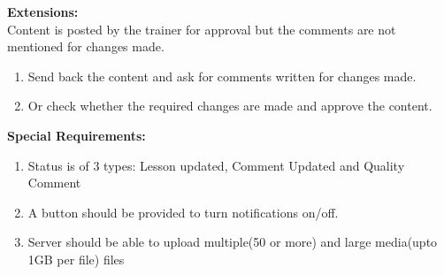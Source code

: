 \documentclass{report}
\begin{document}
\textbf{Extensions:}\\
Content is posted by the trainer for approval but the comments are not mentioned for changes made.
\begin{enumerate}
    \item Send back the content and ask for comments written for changes made.
    \item Or check whether the required changes are made and approve the content.
\end{enumerate}
\textbf{Special Requirements:}
\begin{enumerate}
    \item Status is of 3 types: Lesson updated, Comment Updated and Quality Comment
    \item A button should be provided to turn notifications on/off.
    \item Server should be able to upload multiple(50 or more) and large media(upto 1GB per file) files 
\end{enumerate}
\end{document}

